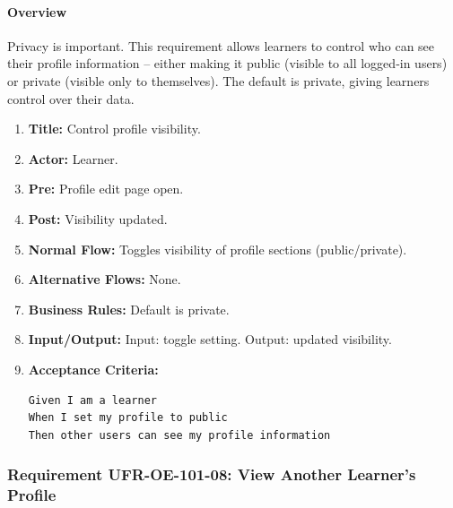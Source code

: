 \paragraph{Overview}
Privacy is important. This requirement allows learners to control who can see their profile information – either making it public (visible to all logged‑in users) or private (visible only to themselves). The default is private, giving learners control over their data.
\begin{enumerate}[label=\textbf{\arabic*.}]
\item \textbf{Title:} Control profile visibility.
\item \textbf{Actor:} Learner.
\item \textbf{Pre:} Profile edit page open.
\item \textbf{Post:} Visibility updated.
\item \textbf{Normal Flow:} Toggles visibility of profile sections (public/private).
\item \textbf{Alternative Flows:} None.
\item \textbf{Business Rules:} Default is private.
\item \textbf{Input/Output:} Input: toggle setting. Output: updated visibility.
\item \textbf{Acceptance Criteria:}
    \begin{verbatim}
Given I am a learner
When I set my profile to public
Then other users can see my profile information
    \end{verbatim}
\end{enumerate}

\subsubsection{Requirement UFR-OE-101-08: View Another Learner’s Profile}
